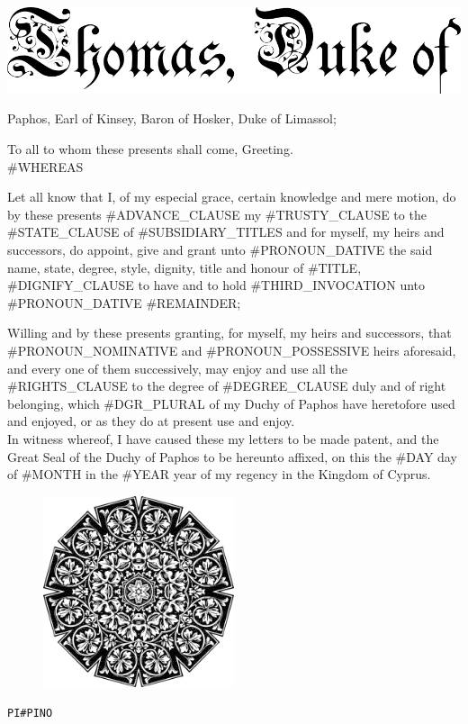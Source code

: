 \documentclass[varwidth=true,border=50pt]{standalone}
\begin{document}
    \thispagestyle{fancy}

    \noindent \includegraphics[width=\textwidth]{images/thomas_duke_of}

    {\LARGE

        Paphos, Earl of Kinsey, Baron of Hosker, Duke of Limassol;

        \setlength{\parindent}{20pt}

        To all to whom these presents shall come, Greeting.\\

        #WHEREAS

        Let all know that I, of my especial grace, certain knowledge and mere
        motion, do by these presents #ADVANCE_CLAUSE my #TRUSTY_CLAUSE
        \hspace{7pt}{\hoskeroe #GRANTEE}\hspace{7pt} to the #STATE_CLAUSE of
        \hspace{7pt}{\hoskeroe #TITLE}\hspace{7pt} #SUBSIDIARY_TITLES and for
        myself, my heirs and successors, do appoint, give and grant unto
        #PRONOUN_DATIVE the said name, state, degree, style, dignity, title and
        honour of #TITLE, #DIGNIFY_CLAUSE to have and to hold #THIRD_INVOCATION
        unto #PRONOUN_DATIVE #REMAINDER;

        Willing and by these presents granting, for myself, my heirs and
        successors, that #PRONOUN_NOMINATIVE and #PRONOUN_POSSESSIVE heirs
        aforesaid, and every one of them successively, may enjoy and use all
        the #RIGHTS_CLAUSE to the degree of #DEGREE_CLAUSE duly and of right
        belonging, which #DGR_PLURAL of my Duchy of Paphos have heretofore used
        and enjoyed, or as they do at present use and enjoy.\\

        In witness whereof, I have caused these my letters to be made patent,
        and the Great Seal of the Duchy of Paphos to be hereunto affixed, on
        this the #DAY day of #MONTH in the #YEAR year of my regency in the
        Kingdom of Cyprus.
    }

    \begin{figure}[h]
        \centering
        \includegraphics[width=0.5\textwidth]{images/seal}
    \end{figure}

    \hfill {\footnotesize \texttt{PI{#PINO}}}
\end{document}
